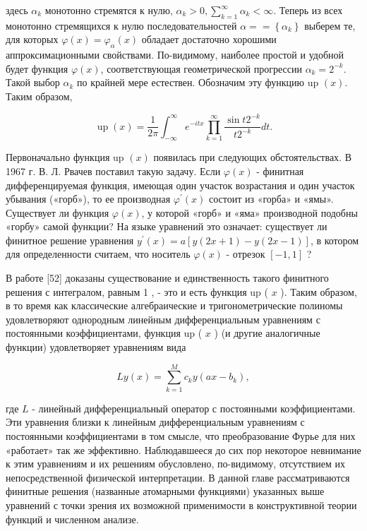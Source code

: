 \documentclass[10pt]{article}
\begin{document}
здесь $\alpha_{k}$ монотонно стремятся к нулю, $\alpha_{k}>0, \sum_{k=1}^{\infty} \alpha_{k}<\infty$. Теперь из всех монотонно стремящихся к нулю последовательностей $\alpha= =\left\{\alpha_{k}\right\}$ выберем те, для которых $\varphi(x)=\varphi_{\alpha}(x)$ обладает достаточно хорошими аппроксимационными свойствами. По-видимому, наиболее простой и удобной будет функция $\varphi(x)$, соответствующая геометрической прогрессии $\alpha_{k}=2^{-k}$. Такой выбор $\alpha_{k}$ по крайней мере естествен. Обозначим эту функцию up $(x)$. Таким образом,

$$
\operatorname{up}(x)=\frac{1}{2 \pi} \int_{-\infty}^{\infty} e^{-i t x} \prod_{k=1}^{\infty} \frac{\sin t 2^{-k}}{t 2^{-k}} d t .
$$

Первоначально функция up $(x)$ появилась при следующих обстоятельствах. В 1967 г. В. Л. Рвачев поставил такую задачу. Если $\varphi(x)$ - финитная дифференцируемая функция, имеющая один участок возрастания и один участок убывания («горб»), то ее производная $\varphi^{\prime}(x)$ состоит из «горба» и «ямы». Существует ли функция $\varphi(x)$, у которой «горб» и «яма» производной подобны «горбу» самой функции? На языке уравнений это означает: существует ли финитное решение уравнения $y^{\prime}(x)=a[y(2 x+1)-y(2 x-1)]$, в котором для определенности считаем, что носитель $\varphi(x)$ - отрезок $[-1,1]$ ?

В работе [52] доказаны существование и единственность такого финитного решения с интегралом, равным 1 , - это и есть функция up ( $x$ ). Таким образом, в то время как классические алгебраические и тригонометрические полиномы удовлетворяют однородным линейным дифференциальным уравнениям с постоянными коэффициентами, функция up ( $x$ ) (и другие аналогичные функции) удовлетворяет уравнениям вида

$$
L y(x)=\sum_{k=1}^{M} c_{k} y\left(a x-b_{k}\right),
$$

где $L$ - линейный дифференциальный оператор с постоянными коэффициентами. Эти уравнения близки к линейным дифференциальным уравнениям с постоянными коэффициентами в том смысле, что преобразование Фурье для них «работает» так же эффективно. Наблюдавшееся до сих пор некоторое невнимание к этим уравнениям и их решениям обусловлено, по-видимому, отсутствием их непосредственной физической интерпретации. В данной главе рассматриваются финитные решения (названные атомарными функциями) указанных выше уравнений с точки зрения их возможной применимости в конструктивной теории функций и численном анализе.
\end{document}
